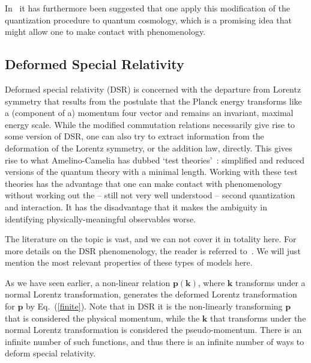 \documentclass{article}
\begin{document}
In~\cite{Kober:2011uj} it has furthermore been suggested that one apply this modification of the quantization
procedure to quantum cosmology, which is a promising idea that might allow one to make contact with
phenomenology.

 \subsection{Deformed Special Relativity}
\label{dsr}

Deformed special relativity (DSR) is concerned with the departure from Lorentz symmetry 
that results from the postulate that the Planck energy transforms like a (component of a)
momentum four vector and remains an invariant, maximal energy scale. 
While the modified commutation relations
necessarily give rise to some version of {\sc DSR}, one can 
also try to extract information from the deformation of
the Lorentz symmetry, or the addition law, directly. This gives rise to what Amelino-Camelia
has dubbed `test theories'~\cite{AmelinoCamelia:2004ht}: simplified and reduced versions of the quantum theory
with a minimal length. Working with these test theories has the advantage that one can make contact with phenomenology
without working out the -- still not very well understood -- second quantization and interaction. 
It has the disadvantage that it makes the ambiguity in identifying physically-meaningful 
observables worse.

The literature on the topic is vast, and we can not cover it in totality here. For
more details on the {\sc DSR} phenomenology, the reader is referred to~\cite{AmelinoCamelia:2008qg,AmelinoCamelia:2010pd}.
We will just mention the most relevant properties of these types of models here. 

As we have
seen earlier, a non-linear relation $\mathbf{p}(\mathbf{k})$, where $\mathbf{k}$ transforms under a normal Lorentz transformation,
generates the deformed Lorentz transformation for $\mathbf{p}$ by Eq.~(\ref{finite}). Note that in {\sc DSR} it is the
non-linearly transforming $\mathbf{p}$ that is considered the physical momentum, while the $\mathbf{k}$ that
transforms under the normal Lorentz transformation is considered the pseudo-momentum. 
There is an infinite number of such functions, and thus there is an infinite number of
ways to deform special relativity. 
\end{document}
